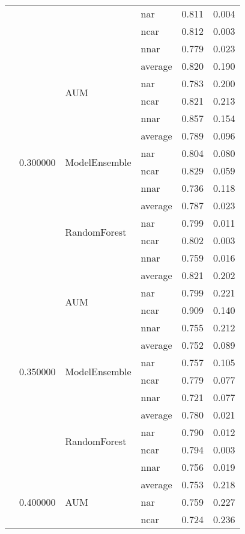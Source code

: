 \begin{longtable}{llllrr}
 &  &  & nar & 0.811 & 0.004 \\
 &  &  & ncar & 0.812 & 0.003 \\
 &  &  & nnar & 0.779 & 0.023 \\
\cline{2-6} \cline{3-6}
 & \multirow[t]{12}{*}{0.300000} & \multirow[t]{4}{*}{AUM} & average & 0.820 & 0.190 \\
 &  &  & nar & 0.783 & 0.200 \\
 &  &  & ncar & 0.821 & 0.213 \\
 &  &  & nnar & 0.857 & 0.154 \\
\cline{3-6}
 &  & \multirow[t]{4}{*}{ModelEnsemble} & average & 0.789 & 0.096 \\
 &  &  & nar & 0.804 & 0.080 \\
 &  &  & ncar & 0.829 & 0.059 \\
 &  &  & nnar & 0.736 & 0.118 \\
\cline{3-6}
 &  & \multirow[t]{4}{*}{RandomForest} & average & 0.787 & 0.023 \\
 &  &  & nar & 0.799 & 0.011 \\
 &  &  & ncar & 0.802 & 0.003 \\
 &  &  & nnar & 0.759 & 0.016 \\
\cline{2-6} \cline{3-6}
 & \multirow[t]{12}{*}{0.350000} & \multirow[t]{4}{*}{AUM} & average & 0.821 & 0.202 \\
 &  &  & nar & 0.799 & 0.221 \\
 &  &  & ncar & 0.909 & 0.140 \\
 &  &  & nnar & 0.755 & 0.212 \\
\cline{3-6}
 &  & \multirow[t]{4}{*}{ModelEnsemble} & average & 0.752 & 0.089 \\
 &  &  & nar & 0.757 & 0.105 \\
 &  &  & ncar & 0.779 & 0.077 \\
 &  &  & nnar & 0.721 & 0.077 \\
\cline{3-6}
 &  & \multirow[t]{4}{*}{RandomForest} & average & 0.780 & 0.021 \\
 &  &  & nar & 0.790 & 0.012 \\
 &  &  & ncar & 0.794 & 0.003 \\
 &  &  & nnar & 0.756 & 0.019 \\
\cline{2-6} \cline{3-6}
 & \multirow[t]{12}{*}{0.400000} & \multirow[t]{4}{*}{AUM} & average & 0.753 & 0.218 \\
 &  &  & nar & 0.759 & 0.227 \\
 &  &  & ncar & 0.724 & 0.236 \\

\end{longtable}

